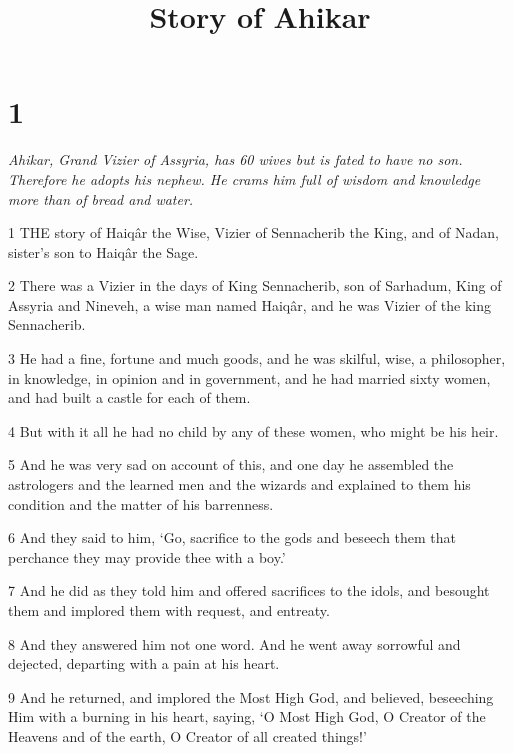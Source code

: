 

\title{Story of Ahikar}

\chapter{1}

\par \textit{Ahikar, Grand Vizier of Assyria, has 60 wives but is fated to have no son. Therefore he adopts his nephew. He crams him full of wisdom and knowledge more than of bread and water.}

\par 1 THE story of Haiqâr the Wise, Vizier of Sennacherib the King, and of Nadan, sister's son to Haiqâr the Sage.

\par 2 There was a Vizier in the days of King Sennacherib, son of Sarhadum, King of Assyria and Nineveh, a wise man named Haiqâr, and he was Vizier of the king Sennacherib.

\par 3 He had a fine, fortune and much goods, and he was skilful, wise, a philosopher, in knowledge, in opinion and in government, and he had married sixty women, and had built a castle for each of them.

\par 4 But with it all he had no child by any of these women, who might be his heir.

\par 5 And he was very sad on account of this, and one day he assembled the astrologers and the learned men and the wizards and explained to them his condition and the matter of his barrenness.

\par 6 And they said to him, ‘Go, sacrifice to the gods and beseech them that perchance they may provide thee with a boy.’

\par 7 And he did as they told him and offered sacrifices to the idols, and besought them and implored them with request, and entreaty.

\par 8 And they answered him not one word. And he went away sorrowful and dejected, departing with a pain at his heart.

\par 9 And he returned, and implored the Most High God, and believed, beseeching Him with a burning in his heart, saying, ‘O Most High God, O Creator of the Heavens and of the earth, O Creator of all created things!’

